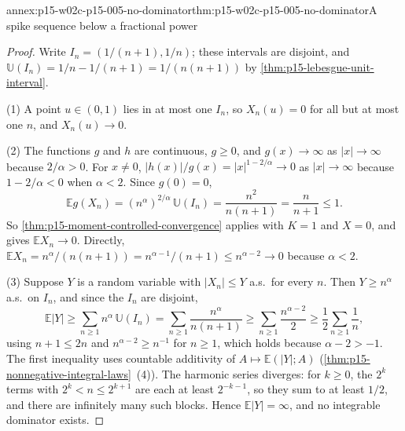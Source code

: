 \begin{annexitem}{annex:p15-w02c-p15-005-no-dominator}{thm:p15-w02c-p15-005-no-dominator}{A spike sequence below a fractional power}
\begin{proof}
Write \(I_n=(1/(n+1),1/n)\); these intervals are disjoint, and
\(\mathbb U(I_n)=1/n-1/(n+1)=1/(n(n+1))\) by
\cref{thm:p15-lebesgue-unit-interval}.

(1) A point \(u\in(0,1)\) lies in at most one \(I_n\), so
\(X_n(u)=0\) for all but at most one \(n\), and \(X_n(u)\to0\).

(2) The functions \(g\) and \(h\) are continuous, \(g\geq0\), and
\(g(x)\to\infty\) as \(|x|\to\infty\) because \(2/\alpha>0\). For
\(x\neq0\), \(|h(x)|/g(x)=|x|^{1-2/\alpha}\to0\) as \(|x|\to\infty\)
because \(1-2/\alpha<0\) when \(\alpha<2\). Since \(g(0)=0\),
\[
 \mathbb Eg(X_n)=(n^\alpha)^{2/\alpha}\,\mathbb U(I_n)
 =\frac{n^2}{n(n+1)}=\frac n{n+1}\leq1 .
\]
So \cref{thm:p15-moment-controlled-convergence} applies with \(K=1\)
and \(X=0\), and gives \(\mathbb EX_n\to0\). Directly,
\(\mathbb EX_n=n^\alpha/(n(n+1))=n^{\alpha-1}/(n+1)\leq n^{\alpha-2}\to0\)
because \(\alpha<2\).

(3) Suppose \(Y\) is a random variable with \(|X_n|\leq Y\) a.s.\ for
every \(n\). Then \(Y\geq n^\alpha\) a.s.\ on \(I_n\), and since the
\(I_n\) are disjoint,
\[
 \mathbb E|Y|\geq\sum_{n\geq1}n^\alpha\,\mathbb U(I_n)
 =\sum_{n\geq1}\frac{n^\alpha}{n(n+1)}
 \geq\sum_{n\geq1}\frac{n^{\alpha-2}}2
 \geq\frac12\sum_{n\geq1}\frac1n ,
\]
using \(n+1\leq2n\) and \(n^{\alpha-2}\geq n^{-1}\) for \(n\geq1\),
which holds because \(\alpha-2>-1\). The first inequality uses
countable additivity of \(A\mapsto\mathbb E(|Y|;A)\)
(\cref{thm:p15-nonnegative-integral-laws}~(4)). The harmonic series
diverges: for \(k\geq0\), the \(2^k\) terms with
\(2^k<n\leq2^{k+1}\) are each at least \(2^{-k-1}\), so they sum to at
least \(1/2\), and there are infinitely many such blocks. Hence
\(\mathbb E|Y|=\infty\), and no integrable dominator exists.
\end{proof}
\end{annexitem}

